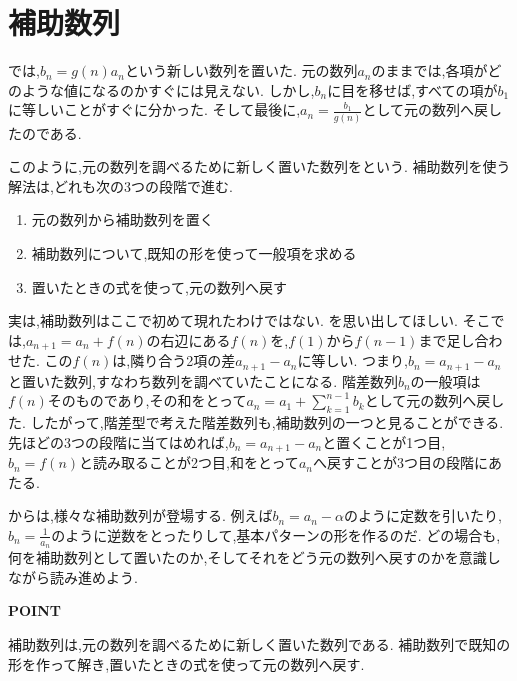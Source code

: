 
\section{補助数列}\label{節：補助数列}
  では,$b_n=g(n)a_n$という新しい数列を置いた.
  元の数列$a_n$のままでは,各項がどのような値になるのかすぐには見えない.
  しかし,$b_n$に目を移せば,すべての項が$b_1$に等しいことがすぐに分かった.
  そして最後に,$a_n=\frac{b_1}{g(n)}$として元の数列へ戻したのである.

  このように,元の数列を調べるために新しく置いた数列を\textbf{}という.
  補助数列を使う解法は,どれも次の3つの段階で進む.
  \begin{enumerate}
    \item 元の数列から補助数列を置く
    \item 補助数列について,既知の形を使って一般項を求める
    \item 置いたときの式を使って,元の数列へ戻す
  \end{enumerate}

  実は,補助数列はここで初めて現れたわけではない.
  を思い出してほしい.
  そこでは,$a_{n+1}=a_n+f(n)$の右辺にある$f(n)$を,$f(1)$から$f(n-1)$まで足し合わせた.
  この$f(n)$は,隣り合う2項の差$a_{n+1}-a_n$に等しい.
  つまり,$b_n=a_{n+1}-a_n$と置いた数列,すなわち数列を調べていたことになる.
  階差数列$b_n$の一般項は$f(n)$そのものであり,その和をとって$a_n=a_1+\sum_{k=1}^{n-1}b_k$として元の数列へ戻した.
  したがって,階差型で考えた階差数列も,補助数列の一つと見ることができる.
  先ほどの3つの段階に当てはめれば,$b_n=a_{n+1}-a_n$と置くことが1つ目,$b_n=f(n)$と読み取ることが2つ目,和をとって$a_n$へ戻すことが3つ目の段階にあたる.

  からは,様々な補助数列が登場する.
  例えば$b_n=a_n-\alpha$のように定数を引いたり,$b_n=\frac{1}{a_n}$のように逆数をとったりして,基本パターンの形を作るのだ.
  どの場合も,何を補助数列として置いたのか,そしてそれをどう元の数列へ戻すのかを意識しながら読み進めよう.

  \begin{bookpoint}
    \textbf{POINT}\par
    補助数列は,元の数列を調べるために新しく置いた数列である.
    補助数列で既知の形を作って解き,置いたときの式を使って元の数列へ戻す.
  \end{bookpoint}
